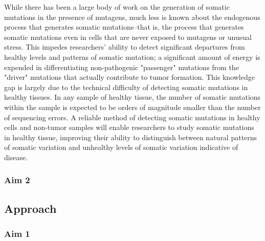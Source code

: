 While there has been a large body of work on the generation of somatic mutations in the presence of mutagens, much less is known about the endogenous process that generates somatic mutations--that is, the process that generates somatic mutations even in cells that are never exposed to mutagens or unusual stress.
This impedes researchers' ability to detect significant departures from healthy levels and patterns of somatic mutation; a significant amount of energy is expended in differentiating non-pathogenic "passenger" mutations from the "driver" mutations that actually contribute to tumor formation.
This knowledge gap is largely due to the technical difficulty of detecting somatic mutations in healthy tissues.
In any sample of healthy tissue, the number of somatic mutations within the sample is expected to be orders of magnitude smaller than the number of sequencing errors.
A reliable method of detecting somatic mutations in healthy cells and non-tumor samples will enable researchers to study somatic mutations in healthy tissue, improving their ability to distinguish between natural patterns of somatic variation and unhealthy levels of somatic variation indicative of disease.

\subsubsection{Aim 2}



\subsection{Approach}
\subsubsection{Aim 1}
